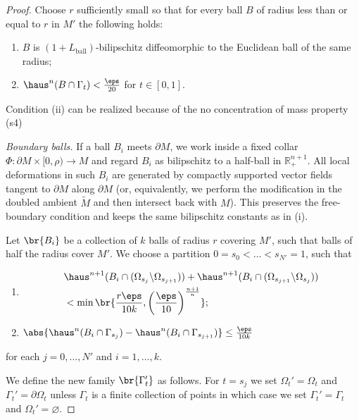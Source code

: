\begin{lemma}
\begin{proof}
        Choose $r$ sufficiently small so that for every ball $B$ of radius less than or equal to $r$ in $M'$ the following holds:
        \begin{enumerate}
            \item[(i)] $B$ is $(1 + L_{\mathrm{ball}})$-bilipschitz diffeomorphic to the Euclidean ball of the same radius;
            \item[(ii)] $\haus^n(B\cap \Gamma_t) < \frac{\eps}{20}$ for $t \in [0, 1]$.
        \end{enumerate}
        Condition (ii) can be realized because of the no concentration of mass property (s4)
        
        \noindent\emph{Boundary balls.}
        If a ball $B_i$ meets $\partial M$, we work inside a fixed collar 
        $\Phi:\partial M\times[0,\rho)\to M$ and regard $B_i$ as bilipschitz to a half-ball 
        in $\mathbb R^{n+1}_+$. All local deformations in such $B_i$ are generated by compactly 
        supported vector fields tangent to $\partial M$ along $\partial M$ 
        (or, equivalently, we perform the modification in the doubled ambient $\widetilde M$ and then 
        intersect back with $M$). This preserves the free-boundary condition and keeps the same 
        bilipschitz constants as in (i).
        
        Let $\br{B_i}$ be a collection of $k$ balls of radius $r$ covering $M'$, such that balls of half the radius cover $M'$. We choose a partition $0 = s_0 < \dots < s_{N'} = 1$, such that
        \begin{enumerate}
            \item[(iii)] \begin{align*}
            &\haus^{n + 1}(B_i\cap(\Omega_{s_j}\backslash\Omega_{s_{j + 1}})) + \haus^{n + 1}(B_i\cap(\Omega_{s_{j + 1}}\backslash\Omega_{s_j})) \\
            &< \min\br{\frac{r\eps}{10k}, \left(\frac{\eps}{10}\right)^{\frac{n + 1}{n}}};
            \end{align*}
            \item[(iv)] $\abs{\haus^n(B_i\cap \Gamma_{s_j}) - \haus^n(B_i\cap \Gamma_{s_{j + 1}})} \leq \frac{\eps}{10k}$
        \end{enumerate}
        for each $j = 0, \dots, N'$ and $i = 1, \dots, k$. 

        We define the new family $\br{\Gamma_t'}$ as follows. For $t = s_j$ we set $\Omega_t' = \Omega_t$ and $\Gamma_t' = \partial\Omega_t$ unless $\Gamma_t$ is a finite collection of points in which case we set $\Gamma_t' = \Gamma_t$ and $\Omega_t' = \varnothing$. 


\end{proof}
\end{lemma}
